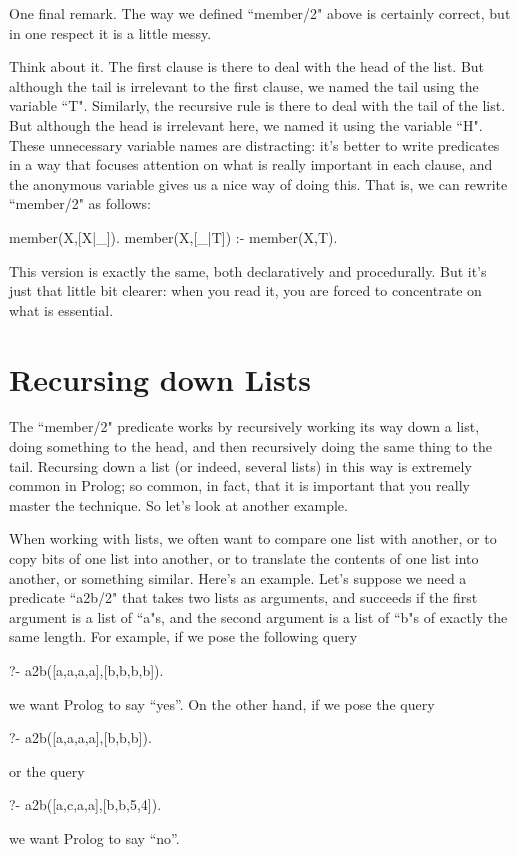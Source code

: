 One final remark.  The way we defined ``member/2" above is
certainly correct, but in one respect it is a little messy.

Think about it. The first clause is there to deal with the head of the
list. But although the tail is irrelevant to the first clause, we
named the tail using the variable ``T". Similarly,
the recursive rule is there to deal with the tail of the list.  But
although the head is irrelevant here, we named it
using the variable  ``H". These unnecessary variable
names are distracting: it's better to write predicates in a way that
focuses attention on what is really important in each clause, and the
anonymous variable gives us a nice way of doing this. That is, we  can rewrite
``member/2" as follows:
\begin{LPNcodedisplay}
member(X,[X|_]).
member(X,[_|T]) :- member(X,T).
\end{LPNcodedisplay}

This version is exactly the same, both declaratively and procedurally.
But it's just that little bit clearer: when you read it, you are
forced to concentrate on what is essential.


\section{Recursing down Lists}\label{SEC.L4.RDAL}

The ``member/2" predicate works by recursively working its way down a
list, doing something to the head, and then recursively doing the same
thing to the tail. Recursing down a list (or indeed, several lists) in
this way is extremely common in Prolog; so common, in fact, that it is
important that you really master the technique. So let's look at another
example.

When working with lists, we often want to compare one list
with another, or to copy bits of one list into another, or to
translate the contents of one list into another, or something similar.
Here's an example. Let's suppose we need a predicate
``a2b/2" that takes two lists as arguments, and succeeds if
the first argument is a list of ``a"s, and the second argument is
a list of ``b"s of exactly the same length.  For example, if we
pose the following query
\begin{LPNcodedisplay}
?- a2b([a,a,a,a],[b,b,b,b]).
\end{LPNcodedisplay}
we want Prolog to say ``yes''. On the other hand, if we pose the query
\begin{LPNcodedisplay}
?- a2b([a,a,a,a],[b,b,b]).
\end{LPNcodedisplay}
or the query
\begin{LPNcodedisplay}
?- a2b([a,c,a,a],[b,b,5,4]).
\end{LPNcodedisplay}
we want Prolog to say ``no''.

